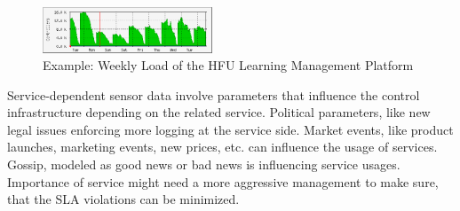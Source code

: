 \begin{figure}[ht]
	\begin{center}
\includegraphics[width=0.45\textwidth]{fig/olat_week_usage}
\end{center}
\caption{Example: Weekly Load of the HFU Learning Management Platform}
\label{fig:weakload}
\end{figure}



Service-dependent sensor data involve parameters that influence the control infrastructure depending on the related service. Political parameters, like new legal issues enforcing more logging at the service side. Market events, like product launches, marketing events, new prices, etc. can influence the usage of services. Gossip, modeled as good news or bad news is influencing service usages. Importance of service might need a more aggressive management to make sure, that the SLA violations can be minimized.

